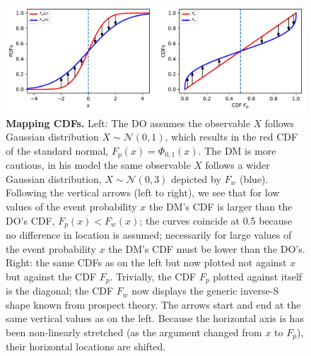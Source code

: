 \documentclass[a4paper, 12pt]{article}
\newcommand{\flabel}[1]{\label{fig:#1}}
\newcommand{\ND}{\mathcal{N}} %
\begin{document}
\begin{figure}[!htb]
\centering
\includegraphics[width=\textwidth]{./figs/GaussianFvsXtoWvsP.pdf}
\caption{{\bf Mapping CDFs.} 
Left: The DO assumes the observable $X$ follows Gaussian distribution $X \sim \ND(0,1)$, which results in the red CDF of the standard normal, $F_p(x) = \Phi_{0,1}(x)$. The DM is more cautious, in his model the same observable $X$ follows a wider Gaussian distribution, $X \sim \ND(0,3)$ depicted by $F_w$ (blue). 
% 
Following the vertical arrows (left to right), we see that for low values of the event probability $x$ the DM's CDF is larger than the DO's CDF, $F_p(x) < F_w(x)$; the curves coincide at 0.5 because no difference in location is assumed; necessarily for large values of the event probability $x$ the DM's CDF must be lower than the DO's.
Right: the same CDFs as on the left but now plotted not against $x$ but against the CDF $F_p$. Trivially, the CDF $F_p$ plotted against itself is the diagonal; the CDF $F_w$ now displays the generic inverse-S shape known from prospect theory. The arrows start and end at the same vertical values as on the left. Because the horizontal axis is has been non-linearly stretched (as the argument changed from $x$ to $F_p$), their horizontal locations are shifted.
}
\flabel{TwoCDFs}
\end{figure}

\FloatBarrier
\end{document}
